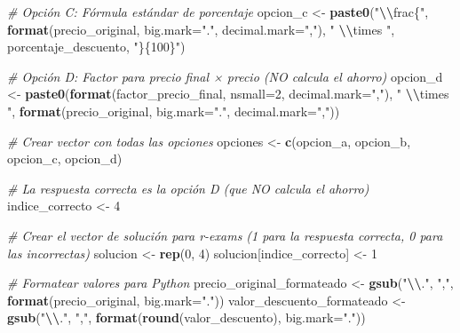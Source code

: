 \documentclass[
]{article}
\newenvironment{Shaded}{\begin{snugshade}}{\end{snugshade}}
\newcommand{\AttributeTok}[1]{\textcolor[rgb]{0.13,0.29,0.53}{#1}}
\newcommand{\CommentTok}[1]{\textcolor[rgb]{0.56,0.35,0.01}{\textit{#1}}}
\newcommand{\DecValTok}[1]{\textcolor[rgb]{0.00,0.00,0.81}{#1}}
\newcommand{\FunctionTok}[1]{\textcolor[rgb]{0.13,0.29,0.53}{\textbf{#1}}}
\newcommand{\NormalTok}[1]{#1}
\newcommand{\OtherTok}[1]{\textcolor[rgb]{0.56,0.35,0.01}{#1}}
\newcommand{\SpecialCharTok}[1]{\textcolor[rgb]{0.81,0.36,0.00}{\textbf{#1}}}
\newcommand{\StringTok}[1]{\textcolor[rgb]{0.31,0.60,0.02}{#1}}
\begin{document}
\begin{Shaded}
\begin{Highlighting}[]
\CommentTok{\# Opción C: Fórmula estándar de porcentaje}
\NormalTok{opcion\_c }\OtherTok{\textless{}{-}} \FunctionTok{paste0}\NormalTok{(}\StringTok{"}\SpecialCharTok{\textbackslash{}\textbackslash{}}\StringTok{frac\{"}\NormalTok{, }\FunctionTok{format}\NormalTok{(precio\_original, }\AttributeTok{big.mark=}\StringTok{"."}\NormalTok{, }\AttributeTok{decimal.mark=}\StringTok{","}\NormalTok{), }\StringTok{" }\SpecialCharTok{\textbackslash{}\textbackslash{}}\StringTok{times "}\NormalTok{, porcentaje\_descuento, }\StringTok{"\}\{100\}"}\NormalTok{)}

\CommentTok{\# Opción D: Factor para precio final × precio (NO calcula el ahorro)}
\NormalTok{opcion\_d }\OtherTok{\textless{}{-}} \FunctionTok{paste0}\NormalTok{(}\FunctionTok{format}\NormalTok{(factor\_precio\_final, }\AttributeTok{nsmall=}\DecValTok{2}\NormalTok{, }\AttributeTok{decimal.mark=}\StringTok{","}\NormalTok{), }\StringTok{" }\SpecialCharTok{\textbackslash{}\textbackslash{}}\StringTok{times "}\NormalTok{, }\FunctionTok{format}\NormalTok{(precio\_original, }\AttributeTok{big.mark=}\StringTok{"."}\NormalTok{, }\AttributeTok{decimal.mark=}\StringTok{","}\NormalTok{))}

\CommentTok{\# Crear vector con todas las opciones}
\NormalTok{opciones }\OtherTok{\textless{}{-}} \FunctionTok{c}\NormalTok{(opcion\_a, opcion\_b, opcion\_c, opcion\_d)}

\CommentTok{\# La respuesta correcta es la opción D (que NO calcula el ahorro)}
\NormalTok{indice\_correcto }\OtherTok{\textless{}{-}} \DecValTok{4}

\CommentTok{\# Crear el vector de solución para r{-}exams (1 para la respuesta correcta, 0 para las incorrectas)}
\NormalTok{solucion }\OtherTok{\textless{}{-}} \FunctionTok{rep}\NormalTok{(}\DecValTok{0}\NormalTok{, }\DecValTok{4}\NormalTok{)}
\NormalTok{solucion[indice\_correcto] }\OtherTok{\textless{}{-}} \DecValTok{1}

\CommentTok{\# Formatear valores para Python}
\NormalTok{precio\_original\_formateado }\OtherTok{\textless{}{-}} \FunctionTok{gsub}\NormalTok{(}\StringTok{"}\SpecialCharTok{\textbackslash{}\textbackslash{}}\StringTok{."}\NormalTok{, }\StringTok{","}\NormalTok{, }\FunctionTok{format}\NormalTok{(precio\_original, }\AttributeTok{big.mark=}\StringTok{"."}\NormalTok{))}
\NormalTok{valor\_descuento\_formateado }\OtherTok{\textless{}{-}} \FunctionTok{gsub}\NormalTok{(}\StringTok{"}\SpecialCharTok{\textbackslash{}\textbackslash{}}\StringTok{."}\NormalTok{, }\StringTok{","}\NormalTok{, }\FunctionTok{format}\NormalTok{(}\FunctionTok{round}\NormalTok{(valor\_descuento), }\AttributeTok{big.mark=}\StringTok{"."}\NormalTok{))}
\end{Highlighting}
\end{Shaded}
\end{document}
